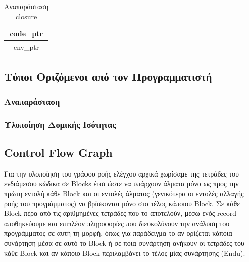\documentclass[12pt]{article}
\begin{document}
\begin{table}[htbp]
\centering
    \begin{tabular}{|c|}
    \hline
    code\_ptr \\ \hline
    env\_ptr  \\ \hline
    \end{tabular}
    \caption{Αναπαράσταση closure}
\end{table}


\subsection{Τύποι Οριζόμενοι από τον Προγραμματιστή}
\subsubsection{Αναπαράσταση}
\subsubsection{Υλοποίηση Δομικής Ισότητας}
\subsection{Control Flow Graph}
Για την υλοποίηση του γράφου ροής ελέγχου αρχικά χωρίσαμε της τετράδες του ενδιάμεσου κώδικα σε Blocks έτσι ώστε να υπάρχουν άλματα μόνο ως προς την πρώτη εντολή κάθε Block και οι εντολές άλματος
(γενικότερα οι εντολές αλλαγής ροής του προγράμματος) να βρίσκονται μόνο στο τέλος κάποιου Block. Σε κάθε Block πέρα από τις αριθμημένες τετράδες που το αποτελούν, μέσω ενός record αποθηκεύουμε και επιπλέον πληροφορίες που διευκολύνουν την ανάλυση του προγράμματος σε αυτή τη μορφή, όπως για παράδειγμα το αν ορίζεται κάποια συνάρτηση μέσα σε αυτό το Block ή σε ποια συνάρτηση ανήκουν οι τετράδες του κάθε Block και αν κάποιο Block περιλαμβάνει το τέλος μίας συνάρτησης (Endu).
\end{document}
